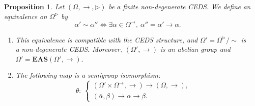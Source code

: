 \documentclass[10pt,a4paper]{amsart}
\numberwithin{equation}{section}
\newtheorem{Proposition}[Theorem]{Proposition}
 { \theoremstyle{definition}
\newtheorem{Definition}[Theorem]{Definition}
\newtheorem{Note}[Theorem]{Note}
\newtheorem{Example}[Theorem]{Example}
\newtheorem{Remark}[Theorem]{Remark}
\newtheorem{Notation}[Theorem]{Notation}}
\newcommand{\eas}{\mathbf{EAS}}
\begin{document}
\begin{Proposition}\label{prop3.12}
Let $(\Omega,\rightarrow,\triangleright)$ be a finite non-degenerate CEDS. We define an equivalence on $\Omega^\triangleright$ by
\[\alpha' \sim \alpha'' \Longleftrightarrow \exists \alpha \in \Omega^\rightarrow, \ \alpha''=\alpha'\rightarrow \alpha.\]
\begin{enumerate}\itemsep=0pt
\item[$(1)$] This equivalence is compatible with the CEDS structure, and $\Omega'=\Omega^\triangleright/{\sim}$ is a non-degen\-er\-ate CEDS. Moreover, $(\Omega',\rightarrow)$ is an abelian group and $\Omega'=\eas(\Omega',\rightarrow)$.
\item[$(2)$] The following map is a semigroup isomorphism:
\[\theta\colon \ \begin{cases}
(\Omega' \times \Omega^\rightarrow,\rightarrow) \longrightarrow (\Omega,\rightarrow),\\
(\overline{\alpha},\beta) \longrightarrow \alpha \rightarrow \beta.
\end{cases}\] \end{enumerate} \end{Proposition}
\end{document}
